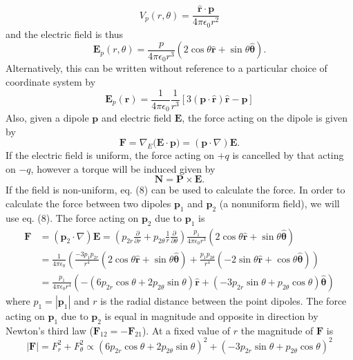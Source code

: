 \documentclass[11pt,letterpaper]{article}
\newcommand{\vect}[1]{\mathbf{#1}}
\begin{document}
\begin{enumerate}
\begin{equation}
V_p(r,\theta) = \frac{\hat{\vect r}\cdot\vect p}{4\pi\epsilon_0r^2}
\end{equation}
and the electric field is thus
\begin{equation}\vect E_p(r,\theta) = \frac{p}{4\pi\epsilon_0r^3}(2\cos\theta\hat{\vect r} +\sin\theta\hat{\vect\theta}).\end{equation}
Alternatively, this can be written without reference to a particular choice of coordinate system by 
\begin{equation} \vect E_p(\vect r) = \frac{1}{4\pi\epsilon_0}\frac{1}{r^3}[3(\vect p\cdot\hat{\vect r})\hat{\vect r}-\vect p]\end{equation}
Also, given a dipole $\vect p$ and electric field $\vect E$, the force acting on the dipole is given by 
\begin{equation}\vect F = \nabla_E{(\vect E\cdot\vect p})=(\vect p\cdot\nabla)\vect E.\end{equation}
If the electric field is uniform, the force acting on $+q$ is cancelled by that acting on $-q$, however a torque will be induced given by
$$\vect N = \vect P\times \vect E.$$
If the field is non-uniform, eq. (8) can be used to calculate the force. In order to calculate the force between two dipoles $\vect p_1$ and $\vect p_2$ (a nonuniform field), we will use eq. (8). The force acting on $\vect p_2$ due to $\vect p_1$ is
\begin{align*}
\vect F &=(\vect p_2\cdot\nabla)\vect E= \left(p_{2r}\frac{\partial}{\partial r}+p_{2\theta}\frac{1}{r}\frac{\partial}{\partial \theta}\right)\frac{p_1}{4\pi\epsilon_0r^3}(2\cos\theta\hat{\vect r} +\sin\theta\hat{\vect\theta})
\\&=\frac{1}{4\pi\epsilon_0}\left(\frac{-3p_1p_{2r}}{r^4}(2\cos\theta\hat{\vect r}+\sin\theta\hat{\vect \theta})+\frac{p_1p_{2\theta}}{r^4}(-2\sin\theta\hat{\vect r}+\cos\theta\hat{\vect\theta})\right)\\
&=\frac{p_1}{4\pi\epsilon_0r^4}\left(-(6p_{2r}\cos\theta+2p_{2\theta}\sin\theta)\hat{\vect r}+(-3p_{2r}\sin\theta+p_{2\theta}\cos\theta)\hat{\vect \theta}\right)
\end{align*}
where $p_1 = |\vect p_1|$ and $r$ is the radial distance between the point dipoles. The force acting on $\vect p_1$ due to $\vect p_2$ is equal in magnitude and opposite in direction by Newton's third law ($\vect F_{12} = -\vect F_{21}$). At a fixed value of $r$ the magnitude of $\vect F$ is 
$$|\vect F| =F_r^2+F_\theta^2\propto (6p_{2r}\cos\theta+2p_{2\theta}\sin\theta)^2+(-3p_{2r}\sin\theta+p_{2\theta}\cos\theta)^2$$

\end{enumerate}
\end{document}
